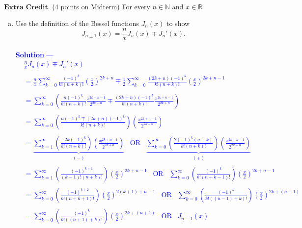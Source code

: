 \documentclass[12pt]{article}
\begin{document}
\noindent $\textbf{Extra Credit}$. (4 points on Midterm) For every $n \in \mathbb{N}$ and $x \in \mathbb{R}$
\begin{enumerate}[(a)]
\item Use the definition of the Bessel functions $J_n(x)$ to show 
$$J_{n\pm1}(x)  = \frac{n}{x} J_n(x) \mp J_n'(x).$$ \\  \textcolor{blue}{\textbf{Solution} — 
\begin{align*}
& \frac{n}{x} J_n(x) \mp J_n'(x)  \\ \\
&= \frac{n}{x} \sum_{k=0}^{\infty} \frac{(-1)^k}{k! (n+k)!}  \left( \frac{x}{2} \right)^{2k + n} \mp \frac{1}{2} \sum_{k=0}^{\infty} \frac{(2k + n)(-1)^k}{k! (n+k)!}  \left( \frac{x}{2} \right)^{2k + n - 1} \\ \\
&= \sum_{k=0}^{\infty} \left(  \frac{n(-1)^k}{k! (n+k)!}  \frac{x^{2k + n - 1}}{2^{2k + n}}  \mp \frac{(2k + n)(-1)^k}{k! (n+k)!}  \frac{x^{2k + n - 1}}{2^{2k + n}} \right) \\ \\
&= \sum_{k=0}^{\infty} \left(  \frac{n(-1)^k \mp (2k + n)(-1)^k}{k! (n+k)!} \right) \left(  \frac{x^{2k + n - 1}}{2^{2k + n}}   \right) \\ \\
&= \underbrace{ \sum_{k=1}^{\infty} \left(  \frac{-2k(-1)^k}{k! (n+k)!} \right) \left(  \frac{x^{2k + n - 1}}{2^{2k + n}}   \right)}_{(-)} \;\;\; \text{OR} \;\;\; \underbrace{\sum_{k=0}^{\infty} \left(  \frac{2(-1)^k (n+k)}{k! (n+k)!} \right) \left(  \frac{x^{2k + n - 1}}{2^{2k + n}}   \right)}_{(+)} \\ \\
&= \sum_{k=1}^{\infty} \left(  \frac{(-1)^{k+1}}{(k-1)! (n+k)!} \right) \left(  \frac{x}{2} \right)^{2k + n - 1} \;\;\; \text{OR} \;\;\; \sum_{k=0}^{\infty} \left(  \frac{(-1)^k}{k! (n+k-1)!} \right) \left(  \frac{x}{2} \right)^{2k + n - 1} \\ \\
&= \sum_{k=0}^{\infty} \left(  \frac{(-1)^{k+2}}{k! (n+k+1)!} \right) \left(  \frac{x}{2} \right)^{2(k+1) + n - 1} \;\;\; \text{OR} \;\;\; \sum_{k=0}^{\infty} \left(  \frac{(-1)^k}{k! ((n-1)+k)!} \right) \left(  \frac{x}{2} \right)^{2k + (n - 1)} \\ \\
&= \sum_{k=0}^{\infty} \left(  \frac{(-1)^{k}}{k! ((n+1)+k)!} \right) \left(  \frac{x}{2} \right)^{2k + (n + 1)} \;\;\; \text{OR} \;\;\; J_{n-1}(x) \\ \\

\end{align*}}
\end{enumerate}
\end{document}
